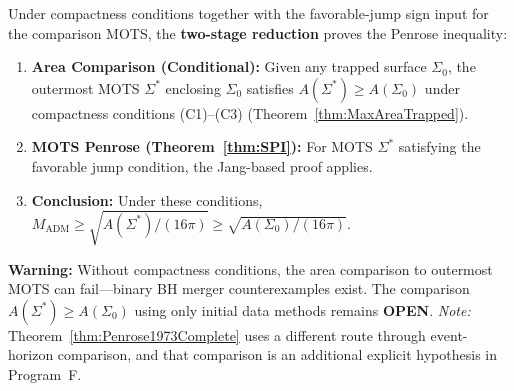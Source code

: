 \begin{remark}\label{rem:ScopeGeneralCase}
Under compactness conditions together with the favorable-jump sign input for the comparison MOTS, the \textbf{two-stage reduction} proves the Penrose inequality:
\begin{enumerate}
    \item \textbf{Area Comparison (Conditional):} Given any trapped surface $\Sigma_0$, the outermost MOTS $\Sigma^*$ enclosing $\Sigma_0$ satisfies $A(\Sigma^*) \ge A(\Sigma_0)$ under compactness conditions (C1)--(C3) (Theorem~\ref{thm:MaxAreaTrapped}).
    \item \textbf{MOTS Penrose (Theorem~\ref{thm:SPI}):} For MOTS $\Sigma^*$ satisfying the favorable jump condition, the Jang-based proof applies.
    \item \textbf{Conclusion:} Under these conditions, $M_{\mathrm{ADM}} \ge \sqrt{A(\Sigma^*)/(16\pi)} \ge \sqrt{A(\Sigma_0)/(16\pi)}$.
\end{enumerate}
\textbf{Warning:} Without compactness conditions, the area comparison to outermost MOTS can fail---binary BH merger counterexamples exist. The comparison $A(\Sigma^*) \ge A(\Sigma_0)$ using only initial data methods remains \textbf{OPEN}. \textit{Note:} Theorem~\ref{thm:Penrose1973Complete} uses a different route through event-horizon comparison, and that comparison is an additional explicit hypothesis in Program~F.
\end{remark}

